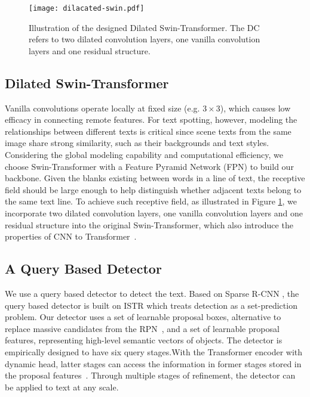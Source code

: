 \documentclass[10pt,twocolumn,letterpaper]{article}
\begin{document}
\begin{figure}[t]
    \centering
    \texttt{[image: dilacated-swin.pdf]}
    \caption{Illustration of the designed Dilated Swin-Transformer. The DC refers to two dilated convolution layers, one vanilla convolution layers and one residual structure.
    }
    \label{fig:Dilated Swin-Transformer}
\end{figure}

\subsection{Dilated Swin-Transformer}

Vanilla convolutions operate locally at fixed size (e.g. $3 \times 3$), which causes low efficacy in connecting remote features. For text spotting, however, modeling the relationships between different texts is critical since scene texts from the same image share strong similarity, such as their backgrounds and text styles. Considering the global modeling capability and computational efficiency, we choose Swin-Transformer \cite{liu2021Swin} with a Feature Pyramid Network (FPN)\cite{lin2017feature} to build our backbone. 
Given the blanks existing between words in a line of text, the receptive field should be large enough to help distinguish whether adjacent texts belong to the same text line. To achieve such receptive field, as illustrated in Figure \ref{fig:Dilated Swin-Transformer}, 
we incorporate two dilated convolution layers\cite{YuKoltun2016}, one vanilla convolution layers and one residual structure into the original Swin-Transformer, which also introduce the properties of CNN to Transformer~\cite{wu2021cvt}.


\subsection{A Query Based Detector}
\label{sec:A Query Based Detector}
We use a query based detector to detect the text. Based on Sparse R-CNN \cite{sun2021sparse}, the query based detector is built on ISTR \cite{hu2021istr} which treats detection as a set-prediction problem. Our detector uses a set of learnable proposal boxes, alternative to replace massive candidates from the RPN~\cite{ren2015faster}, and a set of learnable proposal features, representing high-level semantic vectors of objects. 
The detector is empirically designed to have six query stages.With the Transformer encoder with dynamic head, latter stages can access the information in former stages stored in the proposal features~\cite{jia2016dynamic,tian2020conditional,sun2021sparse}.
Through multiple stages of refinement, the detector can be applied to text at any scale. 
\end{document}
